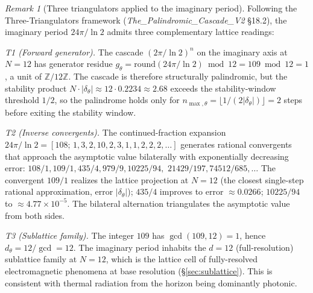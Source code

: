 \documentclass[11pt,a4paper]{article}
\theoremstyle{definition}
\theoremstyle{remark}
\newtheorem{remark}[theorem]{Remark}
\begin{document}
\begin{remark}[Three triangulators applied to the imaginary period]\label{rem:U1-triangulation}
Following the Three-Triangulators framework (\textit{The\_\allowbreak Palindromic\_\allowbreak Cascade\_\allowbreak V2} \S18.2), the imaginary period $24\pi/\ln 2$ admits three complementary lattice readings:

\emph{T1 (Forward generator).} The cascade $(2\pi/\ln 2)^{n}$ on the imaginary axis at $N=12$ has generator residue $g_{\theta} = \mathrm{round}(24\pi/\ln 2) \bmod 12 = 109 \bmod 12 = 1$, a unit of $\mathbb{Z}/12\mathbb{Z}$. The cascade is therefore structurally palindromic, but the stability product $N\cdot |\delta_{\theta}| \approx 12 \cdot 0.2234 \approx 2.68$ exceeds the stability-window threshold $1/2$, so the palindrome holds only for $n_{\max,\theta} = \lfloor 1/(2|\delta_{\theta}|)\rfloor = 2$ steps before exiting the stability window.

\begin{sloppypar}
\emph{T2 (Inverse convergents).} The continued-fraction expansion $24\pi/\ln 2 = [108;\,1,3,2,10,2,3,1,1,2,2,2,\ldots]$\allowbreak{} generates rational convergents that approach the asymptotic value bilaterally with exponentially decreasing error: $108/1, 109/1, 435/4, 979/9, 10225/94,$\allowbreak{} $21429/197, 74512/685,\ldots$\allowbreak{} The convergent $109/1$ realizes the lattice projection at $N=12$ (the closest single-step rational approximation, error $|\delta_{\theta}|$); $435/4$ improves to error $\approx 0.0266$; $10225/94$ to $\approx 4.77\times 10^{-5}$. The bilateral alternation triangulates the asymptotic value from both sides.
\end{sloppypar}

\emph{T3 (Sublattice family).} The integer $109$ has $\gcd(109,12) = 1$, hence $d_{\theta} = 12/\gcd = 12$. The imaginary period inhabits the $d=12$ (full-resolution) sublattice family at $N=12$, which is the lattice cell of fully-resolved electromagnetic phenomena at base resolution (\S\ref{sec:sublattice}). This is consistent with thermal radiation from the horizon being dominantly photonic.
\end{remark}
\end{document}
